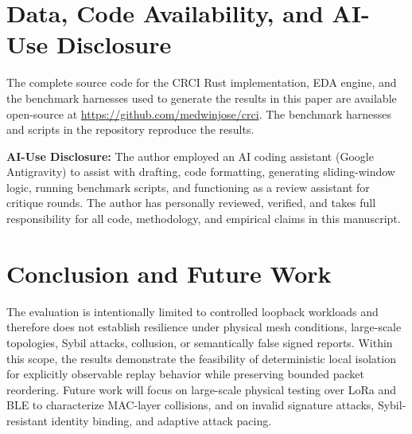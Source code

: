 \documentclass[conference]{IEEEtran}
\begin{document}
\section{Data, Code Availability, and AI-Use Disclosure}
\label{sec:availability}
The complete source code for the CRCI Rust implementation, EDA engine, and the benchmark harnesses used to generate the results in this paper are available open-source at \url{https://github.com/medwinjose/crci}. The benchmark harnesses and scripts in the repository reproduce the results.

\textbf{AI-Use Disclosure:} The author employed an AI coding assistant (Google Antigravity) to assist with drafting, code formatting, generating sliding-window logic, running benchmark scripts, and functioning as a review assistant for critique rounds. The author has personally reviewed, verified, and takes full responsibility for all code, methodology, and empirical claims in this manuscript.

\section{Conclusion and Future Work}
\label{sec:conclusion}
The evaluation is intentionally limited to controlled loopback workloads and therefore does not establish resilience under physical mesh conditions, large-scale topologies, Sybil attacks, collusion, or semantically false signed reports. Within this scope, the results demonstrate the feasibility of deterministic local isolation for explicitly observable replay behavior while preserving bounded packet reordering. Future work will focus on large-scale physical testing over LoRa and BLE to characterize MAC-layer collisions, and on invalid signature attacks, Sybil-resistant identity binding, and adaptive attack pacing.
\end{document}
